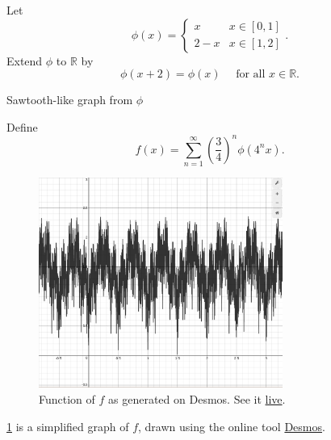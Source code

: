 \documentclass[notoc,notitlepage]{tufte-book}
\begin{document}
\begin{eg}
  Let
  \begin{equation*}
    \phi(x) = \begin{cases}
      x     & x \in [0, 1] \\
      2 - x & x \in [1, 2]
    \end{cases}.
  \end{equation*}
  Extend $\phi$ to $\mathbb{R}$ by
  \begin{equation*}
    \phi ( x + 2 ) = \phi(x) \quad \text{ for all } x \in \mathbb{R}.
  \end{equation*}
  \begin{marginfigure}
    \centering
    \caption{Sawtooth-like graph from $\phi$}\label{fig:sawtooth_like_graph_from_phi_}
  \end{marginfigure}
  \noindent
  Define
  \begin{equation*}
    f(x) = \sum_{n=1}^{\infty} \left( \frac{3}{4} \right)^n \phi \left( 4^n x \right).
  \end{equation*}
  \begin{figure}
    \centering
    \includegraphics[width=8cm]{weierstrass.png}
    \caption{Function of $f$ as generated on Desmos. See it \href{https://www.desmos.com/calculator/rj9r0x5jyu}{live}.}\label{fig:function_of_f_as_generated_on_desmos}
  \end{figure}

  \cref{fig:function_of_f_as_generated_on_desmos} is a simplified graph of $f$, drawn using the online tool \href{https://www.desmos.com}{Desmos}.


\end{eg}
\end{document}
